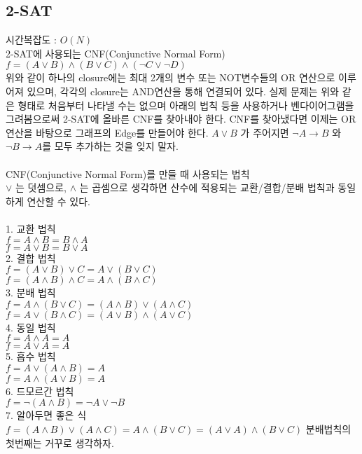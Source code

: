 \documentclass[10pt,landscape,a4paper,twocolumn]{article}
\begin{document}
\subsection{2-SAT}
시간복잡도 : $O(N)$\\
2-SAT에 사용되는 CNF(Conjunctive Normal Form)\\
$f=(A \lor B)\land(B \lor C)\land(\lnot C \lor \lnot D)$\\
위와 같이 하나의 closure에는 최대 2개의 변수 또는 NOT변수들의 OR 연산으로 이루어져 있으며, 각각의 closure는 AND연산을 통해 연결되어 있다. 실제 문제는 위와 같은 형태로 처음부터 나타낼 수는 없으며 아래의 법칙 등을 사용하거나 벤다이어그램을 그려봄으로써 2-SAT에 올바른 CNF를 찾아내야 한다. CNF를 찾아냈다면 이제는 OR 연산을 바탕으로 그래프의 Edge를 만들어야 한다. $A \lor B$ 가 주어지면 $\lnot A \rightarrow B$ 와 $\lnot B \rightarrow A$를 모두 추가하는 것을 잊지 말자.\\
\\
CNF(Conjunctive Normal Form)를 만들 때 사용되는 법칙\\
$\lor$ 는 덧셈으로, $\land$ 는 곱셈으로 생각하면 산수에 적용되는 교환/결합/분배 법칙과 동일하게 연산할 수 있다.\\\\
1. 교환 법칙\\
$f=A \land B = B \land A$\\
$f=A \lor B = B \lor A$\\
2. 결합 법칙\\
$f=(A \lor B)\lor C = A \lor (B \lor C)$\\
$f=(A \land B)\land C = A \land (B \land C)$\\
3. 분배 법칙\\
$f=A \land (B \lor C) = (A \land B) \lor (A \land C)$\\
$f=A \lor (B \land C) = (A \lor B) \land (A \lor C)$\\
4. 동일 법칙\\
$f=A \land A = A$\\
$f=A \lor A = A$\\
5. 흡수 법칙\\
$f=A \lor (A \land B) = A$\\
$f=A \land (A \lor B) = A$\\
6. 드모르간 법칙\\
$f=\lnot (A \land B) = \lnot A \lor \lnot B$\\
7. 알아두면 좋은 식\\
$f=(A \land B) \lor (A \land C) = A \land (B \lor C) = (A \lor A) \land (B \lor C)$ \hspace{1em} 분배법칙의 첫번째는 거꾸로 생각하자.\\
\end{document}
